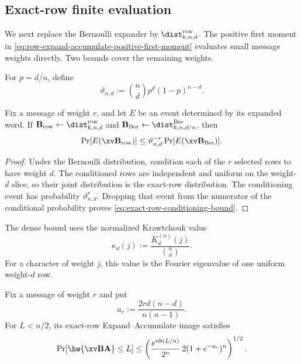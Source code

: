 \subsection{Exact-row finite evaluation}
\label{sec:ea-exact-row-certificate}

We next replace the Bernoulli expander by
$\dist^{\mathrm{row}}_{k,n,d}$.  The positive first moment in
\eqref{eq:row-expand-accumulate-positive-first-moment} evaluates small
message weights directly.  Two bounds cover the remaining weights.

For $p=d/n$, define
\begin{equation}
 \vartheta_{n,d}:=\binom{n}{d}p^d(1-p)^{n-d}.
 \label{eq:exact-row-conditioning-probability}
\end{equation}

\begin{lemma}
\label{lem:exact-row-conditioning}
Fix a message of weight $r$, and let $E$ be an event determined by its
expanded word.  If $\B_{\mathrm{row}}\gets
\dist^{\mathrm{row}}_{k,n,d}$ and
$\B_{\mathrm{Ber}}\gets\dist^{\mathrm{Ber}}_{k,n,d/n}$, then
\begin{equation}
 \Pr[E(\xv\B_{\mathrm{row}})]
 \leq \vartheta_{n,d}^{-r}
 \Pr[E(\xv\B_{\mathrm{Ber}})].
 \label{eq:exact-row-conditioning-bound}
\end{equation}
\end{lemma}

\begin{proof}
Under the Bernoulli distribution, condition each of the $r$ selected rows to
have weight $d$.  The conditioned rows are independent and uniform on the
weight-$d$ slice, so their joint distribution is the exact-row distribution.
The conditioning event has probability $\vartheta_{n,d}^r$.  Dropping that
event from the numerator of the conditional probability proves
\eqref{eq:exact-row-conditioning-bound}.
\end{proof}

The dense bound uses the normalized Krawtchouk value
\begin{equation}
 \kappa_d(j):=\frac{K_d^{(n)}(j)}{\binom{n}{d}}.
 \label{eq:normalized-krawtchouk}
\end{equation}
For a character of weight $j$, this value is the Fourier eigenvalue of one
uniform weight-$d$ row.

\begin{lemma}
\label{lem:exact-row-dense}
Fix a message of weight $r$ and put
\begin{equation}
 a_r:=\frac{2rd(n-d)}{n(n-1)}.
 \label{eq:exact-row-dense-exponent}
\end{equation}
For $L<n/2$, its exact-row Expand--Accumulate image satisfies
\begin{equation}
 \Pr[\hw{\xv\B\A}\leq L]
 \leq
 \left(
  \frac{e^{n\mathsf{h}(L/n)}}{2^n}\,
  2(1+e^{-a_r})^n
 \right)^{1/2}.
 \label{eq:exact-row-dense-bound}
\end{equation}
\end{lemma}

